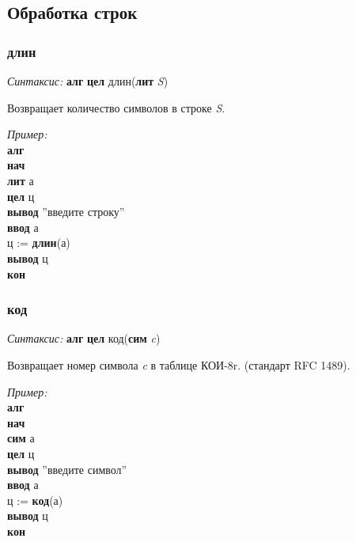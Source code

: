 \subsection{Обработка строк}

\subsubsection{длин}

\emph{Синтаксис:} \textbf{алг} \textbf{цел} длин(\textbf{лит} \emph{S})


      

		Возвращает количество символов в строке \emph{S}.
      
\emph{Пример:}  
\sffamily
~\\\textbf{алг 
~\\нач
~\\\otstup лит} а
~\\\otstup \textbf{цел} ц
~\\\otstup \textbf{вывод} ''введите строку''
~\\\otstup \textbf{ввод} а
~\\\otstup ц := \textbf{длин}(а)
~\\\otstup \textbf{вывод} ц
~\\\textbf{кон}

\normalfont
\subsubsection{код}

\emph{Синтаксис:} \textbf{алг} \textbf{цел} код(\textbf{сим} \emph{c})


    

      Возвращает номер символа \emph{c}  в таблице КОИ-8r. (стандарт RFC 1489).
      
\emph{Пример:}  
\sffamily
~\\\textbf{алг 
~\\нач
~\\\otstup сим} а
~\\\otstup \textbf{цел} ц
~\\\otstup \textbf{вывод} ''введите символ''
~\\\otstup \textbf{ввод} а
~\\\otstup ц := \textbf{код}(а)
~\\\otstup \textbf{вывод} ц
~\\\textbf{кон}






